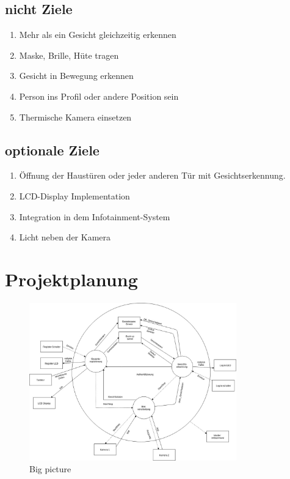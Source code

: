 \subsection{nicht Ziele}
\begin{enumerate}
	\item Mehr als ein Gesicht gleichzeitig erkennen
	
	\item Maske, Brille, Hüte tragen 
	
	\item Gesicht in Bewegung erkennen 
	
	\item Person ins Profil oder andere Position sein
	
	\item Thermische Kamera einsetzen
	
	
\end{enumerate}
\subsection{optionale Ziele}
\begin{enumerate}
	
	
	\item Öffnung der Haustüren oder jeder anderen Tür mit Gesichtserkennung.
	
	\item LCD-Display Implementation
	
	\item Integration in dem Infotainment-System
	
	\item Licht neben der Kamera 
\end{enumerate}
\section{Projektplanung}

	\begin{figure}[!]
		\includegraphics[width=0.8\textwidth]{./figures/Big_Picture.jpg}
		\caption{Big picture}
	\end{figure}

